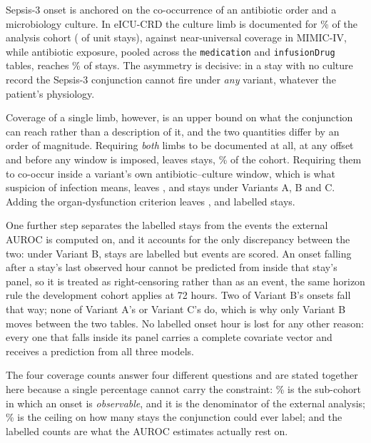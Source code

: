 Sepsis-3 onset is anchored on the co-occurrence of an antibiotic order and a
microbiology culture. In eICU-CRD the culture limb is documented for
\pcExtMicroCoverage\% of the analysis cohort (\pcExtNMicroStays{} of
\pcExtNCohortStays{} unit stays), against near-universal coverage in MIMIC-IV,
while antibiotic exposure, pooled across the \texttt{medication} and
\texttt{infusionDrug} tables, reaches \pcExtAbxCoverage\% of stays. The
asymmetry is decisive: in a stay with no culture record the Sepsis-3
conjunction cannot fire under \emph{any} variant, whatever the patient's
physiology.

Coverage of a single limb, however, is an upper bound on what the conjunction
can reach rather than a description of it, and the two quantities differ by an
order of magnitude. Requiring \emph{both} limbs to be documented at all, at
any offset and before any window is imposed, leaves \pcExtNBothLimbStays{}
stays, \pcExtBothLimbCoverage\% of the cohort. Requiring them to co-occur
inside a variant's own antibiotic--culture window, which is what suspicion of
infection means, leaves \pcExtNSuspicionA{}, \pcExtNSuspicionB{} and
\pcExtNSuspicionC{} stays under Variants A, B and C. Adding the
organ-dysfunction criterion leaves \pcExtNOnsetStaysA{},
\pcExtNOnsetStaysB{} and \pcExtNOnsetStaysC{} labelled stays.

One further step separates the labelled stays from the events the external
AUROC is computed on, and it accounts for the only discrepancy between the two:
under Variant B, \pcExtNOnsetStaysB{} stays are labelled but
\pcExtNEventsB{} events are scored. An onset falling after a stay's last
observed hour cannot be predicted from inside that stay's panel, so it is
treated as right-censoring rather than as an event, the same horizon rule the
development cohort applies at 72 hours. Two of Variant B's onsets fall that way;
none of Variant A's or Variant C's do, which is why only Variant B moves between
the two tables. No labelled onset hour is lost for any other reason: every one
that falls inside its panel carries a complete covariate vector and receives a
prediction from all three models.

The four coverage counts
answer four different questions and are stated together here because a single
percentage cannot carry the constraint: \pcExtMicroCoverage\% is the sub-cohort
in which an onset is \emph{observable}, and it is the denominator of the
external analysis; \pcExtBothLimbCoverage\% is the ceiling on how many stays
the conjunction could ever label; and the labelled counts are what the AUROC
estimates actually rest on.

